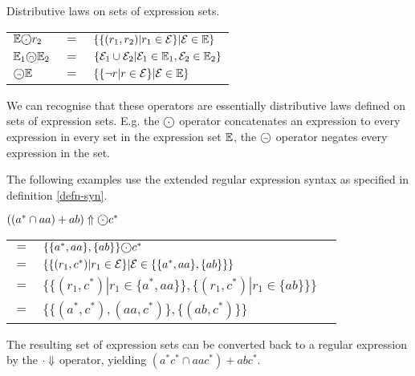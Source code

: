 \begin{defn}
   \label{defn-eset-ops}
   Distributive laws on sets of expression sets.

   \begin{tabular}{lll}
      $\esets \circledcdot r_2$
         & $=$
         & $\{ \{ (r_1, r_2) | r_1 \in \mathcal{E} \} | \mathcal{E} \in \mathbb{E} \}$
         \\

      $\mathbb{E}_1 \text{\textcircled{\tiny$\cap$}} \mathbb{E}_2$
         & $=$
         & $\{
              \mathcal{E}_1 \cup \mathcal{E}_2
              | \mathcal{E}_1 \in \mathbb{E}_1, \mathcal{E}_2 \in \mathbb{E}_2
           \}$
         \\

      $\text{\textcircled{\tiny$\neg$}}\mathbb{E}$
         & $=$
         & $\{ \{ \neg r | r \in \mathcal{E} \} | \mathcal{E} \in \mathbb{E} \}$
         \\
   \end{tabular}
\end{defn}

We can recognise that these operators are essentially distributive laws defined
on sets of expression sets. E.g. the $\circledcdot$ operator concatenates an
expression to every expression in every set in the expression set $\mathbb{E}$, the
$\text{\textcircled{\tiny$\neg$}}$ operator negates every expression in the set.

The following examples use the extended regular expression syntax as specified
in definition \ref{defn-syn}.

\begin{eg}
   $((a^* \cap aa) + ab)\esetsOfRe \circledcdot c^*$

   \begin{tabular}{lll}
      $=$ &
         $\{\{a^*, aa\}, \{ab\}\} \circledcdot c^*$
      \\ $=$ &
         $\{ \{ (r_1, c^*) | r_1 \in \mathcal{E} \} | \mathcal{E} \in \{\{a^*, aa\}, \{ab\}\} \}$
      \\ $=$ &
         $\{ \{ (r_1, c^*) | r_1 \in \{a^*, aa\} \}, \{ (r_1, c^*) | r_1 \in \{ab\} \} \}$
      \\ $=$ &
         $\{ \{ (a^*, c^*), (aa, c^*) \}, \{ (ab, c^*) \} \}$
   \end{tabular}

   The resulting set of expression sets can be converted back to a regular
   expression by the $\cdot\Downarrow$ operator, yielding $(a^*c^* \cap aac^*) +
   abc^*$.
\end{eg}

